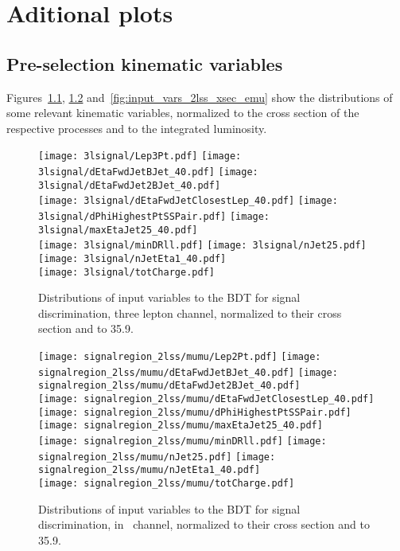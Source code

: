 \chapter{Aditional plots}


\section{Pre-selection kinematic variables} \label{app:presel_plots}

Figures~\ref{fig:input_vars_3l_xsec}, \ref{fig:input_vars_2lss_xsec_mumu} and~\ref{fig:input_vars_2lss_xsec_emu} show the distributions of some relevant kinematic variables, normalized to the cross section of the respective processes and to the integrated luminosity.
\newpage
\begin{figure} [!h]
  \centering
  \texttt{[image: 3lsignal/Lep3Pt.pdf]}
  \texttt{[image: 3lsignal/dEtaFwdJetBJet\_40.pdf]}
  \texttt{[image: 3lsignal/dEtaFwdJet2BJet\_40.pdf]}\\
  \texttt{[image: 3lsignal/dEtaFwdJetClosestLep\_40.pdf]} 
  \texttt{[image: 3lsignal/dPhiHighestPtSSPair.pdf]}
  \texttt{[image: 3lsignal/maxEtaJet25\_40.pdf]}\\
  \texttt{[image: 3lsignal/minDRll.pdf]}
  \texttt{[image: 3lsignal/nJet25.pdf]} 
  \texttt{[image: 3lsignal/nJetEta1\_40.pdf]}\\
  \texttt{[image: 3lsignal/totCharge.pdf]}
  \caption[Input variables to the BDT, $3l$ channel.]{Distributions of input variables to the BDT for signal discrimination, three lepton channel, normalized to their cross section and to 35.9\fbinv.}
  \label{fig:input_vars_3l_xsec}
\end{figure}

\begin{figure} [!h]
  \centering
  \texttt{[image: signalregion\_2lss/mumu/Lep2Pt.pdf]}
  \texttt{[image: signalregion\_2lss/mumu/dEtaFwdJetBJet\_40.pdf]}
  \texttt{[image: signalregion\_2lss/mumu/dEtaFwdJet2BJet\_40.pdf]}\\
  \texttt{[image: signalregion\_2lss/mumu/dEtaFwdJetClosestLep\_40.pdf]}
  \texttt{[image: signalregion\_2lss/mumu/dPhiHighestPtSSPair.pdf]}
  \texttt{[image: signalregion\_2lss/mumu/maxEtaJet25\_40.pdf]}\\
  \texttt{[image: signalregion\_2lss/mumu/minDRll.pdf]}
  \texttt{[image: signalregion\_2lss/mumu/nJet25.pdf]} 
  \texttt{[image: signalregion\_2lss/mumu/nJetEta1\_40.pdf]}\\
  \texttt{[image: signalregion\_2lss/mumu/totCharge.pdf]}
  \caption[Input variables to the BDT, $2lss - \mumu$ channel]{Distributions of input variables to the BDT for signal discrimination, in \mumu\ channel, normalized to their cross section and to 35.9\fbinv.}
  \label{fig:input_vars_2lss_xsec_mumu}
\end{figure}

